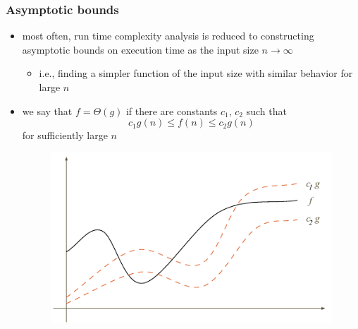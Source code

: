 \begin{frame}[fragile]
%
  \frametitle{Asymptotic bounds}
%
  \begin{itemize}
%
  \item most often, run time complexity analysis is reduced to constructing asymptotic bounds
    on execution time as the input size $n \rightarrow \infty$
    \begin{itemize}
    \item i.e., finding a simpler function of the input size with similar behavior for large
      $n$ 
    \end{itemize}
%
  \item we say that $f = \Theta(g)$ if there are constants $c_{1}$, $c_{2}$ such that 
    \[c_{1} g(n) \leq f(n) \leq c_{2} g(n)\]
    for sufficiently large $n$
%
    \begin{figure}
      \centering
      \includegraphics[scale=.5]{figures/asymptotic-theta.pdf}
    \end{figure}
%
  \end{itemize}
%
\end{frame}

